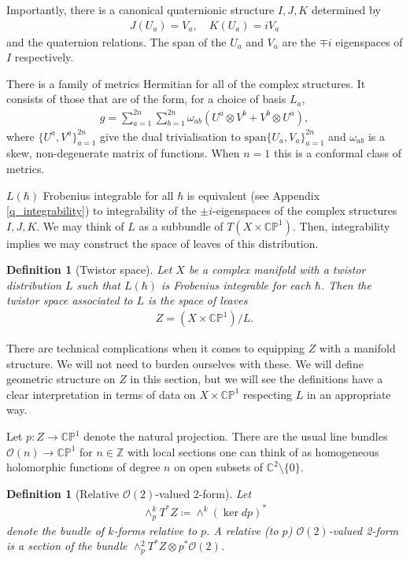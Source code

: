 \documentclass[a4paper,12pt,reqno]{amsart}
\newcounter{counter2}
\numberwithin{equation}{section}
\numberwithin{counter2}{section}
\newcounter{counter3}
\newtheorem{defn}[counter2]{Definition}
\begin{document}
Importantly,  there is a canonical quaternionic structure $I,J,K$  determined by
\begin{align}\label{quaternions} 
J(U_a) = V_a,  \quad K(U_a) = iV_a
\end{align}
and the quaternion relations.  The span of the $U_a$ and $V_a$ are the $\mp i$ eigenspaces of $I$ respectively. \par 
There is a family of metrics Hermitian for all of the complex structures.  It consists of those that are of the form,  for a choice of basis $L_{a}$,  
\begin{align}
g = \sum_{a=1}^{2n} \sum_{b=1}^{2n} \omega_{ab} (U^{a} \otimes V^{b}   + V^{b} \otimes U^{a}),
\end{align}
where $\{U^{a},V^{a}\}_{a=1}^{2n}$ give the dual trivialisation to $\mathrm{span}\{U_{a},  V_{a}\}_{a=1}^{2n}$ and $\omega_{ab}$ is a skew, non-degenerate matrix of functions.   When $n=1$ this is a conformal class of metrics.  \par 
$L(\hbar)$ Frobenius integrable for all $\hbar$ is equivalent (see Appendix \ref{q_integrability}) to integrability of the $\pm i$-eigenspaces of the complex structures $I,J,K$.  We may think of $L$ as a subbundle of $T(X \times \mathbb{CP}^1)$.  Then,  integrability implies we may construct the space of leaves of this distribution. 
\begin{defn}[Twistor space]
Let $X$ be a complex manifold with a twistor distribution $L$ such that $L(\hbar)$ is Frobenius integrable for each $\hbar$.  Then the \textit{twistor space} associated to $L$ is the space of leaves
\begin{align}
Z = (X \times \mathbb{CP}^1) / L. 
\end{align}
\end{defn}
There are technical complications when it comes to equipping $Z$ with a manifold structure.  We will not need to burden ourselves with these.  We will define geometric structure on $Z$ in this section,  but  we will see the definitions have a clear interpretation in terms of data on $X \times \mathbb{CP}^1$ respecting $L$ in an appropriate way.   \par 
Let $p: Z \to \mathbb{CP}^1$ denote the natural projection.  There are the usual line bundles $\mathcal{O}(n) \to \mathbb{CP}^1$ for $n \in \mathbb{Z}$ with local sections one can think of as homogeneous holomorphic functions of degree $n$ on open subsets of $\mathbb{C}^2 \setminus \{0\}$.  
  \begin{defn}[Relative $\mathcal{O}(2)$-valued 2-form]
Let
 \begin{align}
 \wedge^k_pT^*Z \coloneqq \wedge^k({\operatorname{ker} dp})^*
 \end{align}
denote the bundle of $k$-forms relative to $p$.  
  A relative (to $p$) $\mathcal{O}(2)$-valued 2-form is a section of the bundle $\wedge^2_pT^* Z \otimes p^*\mathcal{O}(2)$. 
  \end{defn}
\end{document}
